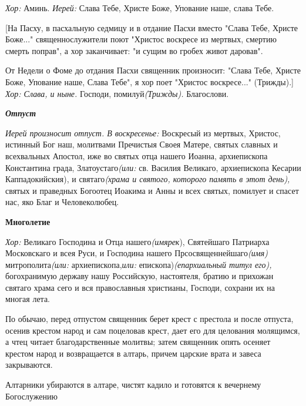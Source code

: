 {\itshape  Хор:} Аминь. {\itshape  Иерей:} Слава Тебе, Христе Боже, Упование наше, слава Тебе.

    [На Пасху, в пасхальную седмицу и в отдание Пасхи вместо "Слава Тебе, Христе Боже..." священнослужители поют "Христос воскресе из мертвых, смертию смерть поправ", а хор заканчивает: "и сущим во гробех живот даровав". 

    От Недели о Фоме до отдания Пасхи священник произносит: "Слава Тебе, Христе Боже, Упование наше, Слава Тебе", я хор поет "Христос воскресе..." (Трижды).] {\itshape  Хор: Слава, и ныне.} Господи, помилуй{\itshape  (Трижды).} Благослови. 

 {\bfseries {\itshape  Отпуст }}

{\itshape  Иерей произносит отпуст. В воскресенье:} Воскресый из мертвых, Христос, истинный Бог наш, молитвами Пречистыя Своея Матере, святых славных и всехвальных Апостол, иже во святых отца нашего Иоанна, архиепископа Константина града, Златоустаго{\itshape  (или:} св. Василия Великаго, архиепископа Кесарии Каппадокийския), и святаго{\itshape  (храма и святого, которого память в этот день),} святых и праведных Богоотец Иоакима и Анны и всех святых, помилует и спасет нас, яко Благ и Человеколюбец.

 {\bfseries  Многолетие }

{\itshape  Хор:} Великаго Господина и Отца нашего{\itshape  (имярек}), Святейшаго Патриарха Московскаго и всея Руси, и Господина нашего Прсосвященнейшаго{\itshape  (имя)} митрополита{\itshape  (или:} архиепископа,{\itshape  или:} епископа){\itshape  (епархиальный титул его),} богохранимую державу нашу Российскую, настоятеля, братию и прихожан святаго храма сего и вся православныя христианы, Господи, сохрани их на многая лета.

  По обычаю, перед отпустом священник берет крест с престола и после отпуста, осенив крестом народ и сам поцеловав крест, дает его для целования молящимся, а чтец читает благодарственные молитвы; затем священник опять осеняет крестом народ и возвращается в алтарь, причем царские врата и завеса закрываются.

  Алтарники убираются в алтаре, чистят кадило и готовятся к вечернему Богослужению
